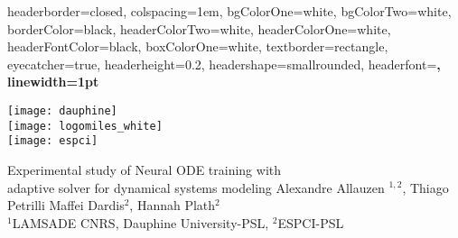 \documentclass[landscape,a0paper,fontscale=0.285]{baposter} %
\begin{document}
\begin{poster}
{
headerborder=closed, %
colspacing=1em, %
bgColorOne=white, %
bgColorTwo=white, %
borderColor=black, %
headerColorTwo=white, %
headerColorOne=white, %
headerFontColor=black, %
boxColorOne=white, %
textborder=rectangle, %
eyecatcher=true, %
headerheight=0.2\textheight, %
headershape=smallrounded, %
headerfont=\Large\bf\textsc, %
linewidth=1pt %
}
%
{
  \begin{minipage}{0.2\textwidth}
    \texttt{[image: dauphine]}\\
    \texttt{[image: logomiles\_white]}\\[1ex]
    \texttt{[image: espci]}%
  \end{minipage}
}
{{\color{bleutitre}Experimental study of Neural ODE training with\\[0.5ex] adaptive solver
  for dynamical systems modeling}\vspace{1ex}} %
{  Alexandre Allauzen $^{1,2}$, Thiago Petrilli Maffei Dardis$^{2}$, Hannah Plath$^{2}$\\
  $^{1}$LAMSADE CNRS, Dauphine University-PSL, $^{2}$ESPCI-PSL
} %
{} %





\end{poster}
\end{document}
